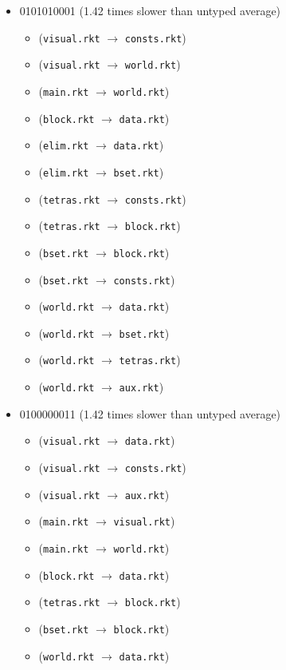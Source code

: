 \documentclass{article}
\newcommand{\mono}[1]{\texttt{#1}}
\begin{document}
\begin{itemize}
\begin{itemize}
  \end{itemize}
\item 0101010001 (1.42 times slower than untyped average)
  \begin{itemize}
  \item (\mono{visual.rkt} $\rightarrow$ \mono{consts.rkt})
  \item (\mono{visual.rkt} $\rightarrow$ \mono{world.rkt})
  \item (\mono{main.rkt} $\rightarrow$ \mono{world.rkt})
  \item (\mono{block.rkt} $\rightarrow$ \mono{data.rkt})
  \item (\mono{elim.rkt} $\rightarrow$ \mono{data.rkt})
  \item (\mono{elim.rkt} $\rightarrow$ \mono{bset.rkt})
  \item (\mono{tetras.rkt} $\rightarrow$ \mono{consts.rkt})
  \item (\mono{tetras.rkt} $\rightarrow$ \mono{block.rkt})
  \item (\mono{bset.rkt} $\rightarrow$ \mono{block.rkt})
  \item (\mono{bset.rkt} $\rightarrow$ \mono{consts.rkt})
  \item (\mono{world.rkt} $\rightarrow$ \mono{data.rkt})
  \item (\mono{world.rkt} $\rightarrow$ \mono{bset.rkt})
  \item (\mono{world.rkt} $\rightarrow$ \mono{tetras.rkt})
  \item (\mono{world.rkt} $\rightarrow$ \mono{aux.rkt})
  \end{itemize}
\item 0100000011 (1.42 times slower than untyped average)
  \begin{itemize}
  \item (\mono{visual.rkt} $\rightarrow$ \mono{data.rkt})
  \item (\mono{visual.rkt} $\rightarrow$ \mono{consts.rkt})
  \item (\mono{visual.rkt} $\rightarrow$ \mono{aux.rkt})
  \item (\mono{main.rkt} $\rightarrow$ \mono{visual.rkt})
  \item (\mono{main.rkt} $\rightarrow$ \mono{world.rkt})
  \item (\mono{block.rkt} $\rightarrow$ \mono{data.rkt})
  \item (\mono{tetras.rkt} $\rightarrow$ \mono{block.rkt})
  \item (\mono{bset.rkt} $\rightarrow$ \mono{block.rkt})
  \item (\mono{world.rkt} $\rightarrow$ \mono{data.rkt})

\end{itemize}
\end{itemize}
\end{document}
